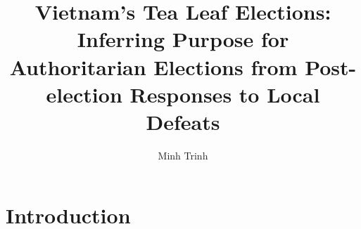 \documentclass[12pt]{article}\usepackage[]{graphicx}\usepackage[]{color}
\title{Vietnam's Tea Leaf Elections: \\
	Inferring Purpose for Authoritarian Elections from Post-election Responses to Local Defeats}
\author{Minh Trinh}
\newcommand{\1}{\mathbbm{1}}
\begin{document}
\maketitle

\begin{abstract}
	
\end{abstract}

\doublespacing

\section{Introduction}
\end{document}
